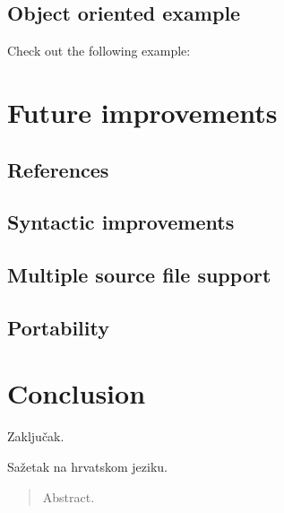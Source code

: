 \documentclass[times, utf8, diplomski]{fer}
\theoremstyle{definition}
\newcommand{\textcode}[3]{
    
}
\begin{document}
\section{Object oriented example}

Check out the following example:
\textcode{\resdir/programs/string_mgmt.agt}{}{a}


\chapter{Future improvements}

\section{References}

\section{Syntactic improvements}

\section{Multiple source file support}

\section{Portability}





\chapter{Conclusion}
Zaključak.




\begin{sazetak}
Sažetak na hrvatskom jeziku.

\end{sazetak}

\begin{abstract}
Abstract.

\end{abstract}
\end{document}
